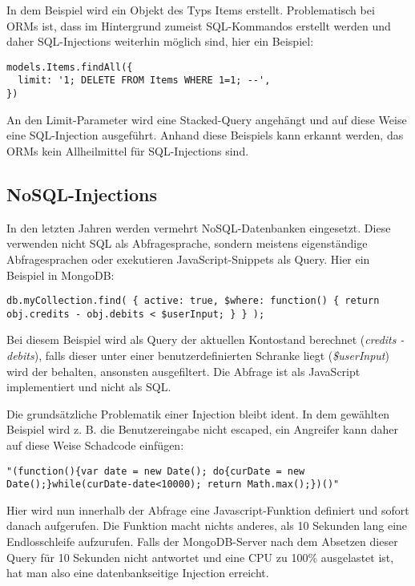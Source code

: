 In dem Beispiel wird ein Objekt des Typs Items erstellt. Problematisch bei ORMs ist, dass im Hintergrund zumeist SQL-Kommandos erstellt werden und daher SQL-Injections weiterhin möglich sind, hier ein Beispiel:

\begin{verbatim}
models.Items.findAll({
  limit: '1; DELETE FROM Items WHERE 1=1; --',
})
\end{verbatim}

An den Limit-Parameter wird eine Stacked-Query angehängt und auf diese Weise eine SQL-Injection ausgeführt. Anhand diese Beispiels kann erkannt werden, das ORMs kein Allheilmittel für SQL-Injections sind.

\subsection{NoSQL-Injections}

In den letzten Jahren werden vermehrt NoSQL-Datenbanken eingesetzt. Diese verwenden nicht SQL als Abfragesprache, sondern meistens eigenständige Abfragesprachen oder exekutieren JavaScript-Snippets als Query. Hier ein Beispiel in MongoDB:

\begin{verbatim}
db.myCollection.find( { active: true, $where: function() { return obj.credits - obj.debits < $userInput; } } );
\end{verbatim}

Bei diesem Beispiel wird als Query der aktuellen Kontostand berechnet (\textit{credits - debits}), falls dieser unter einer benutzerdefinierten Schranke liegt (\textit{\$userInput}) wird der behalten, ansonsten ausgefiltert. Die Abfrage ist als JavaScript implementiert und nicht als SQL.

Die grundsätzliche Problematik einer Injection bleibt ident. In dem gewählten Beispiel wird z. B. die Benutzereingabe nicht escaped, ein Angreifer kann daher auf diese Weise Schadcode einfügen:

\begin{verbatim}
"(function(){var date = new Date(); do{curDate = new Date();}while(curDate-date<10000); return Math.max();})()"
\end{verbatim}

Hier wird nun innerhalb der Abfrage eine Javascript-Funktion definiert und sofort danach aufgerufen. Die Funktion macht nichts anderes, als 10 Sekunden lang eine Endlosschleife aufzurufen. Falls der MongoDB-Server nach dem Absetzen dieser Query für 10 Sekunden nicht antwortet und eine CPU zu 100\% ausgelastet ist, hat man also eine datenbankseitige Injection erreicht.

